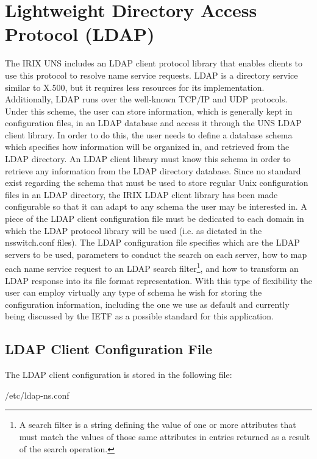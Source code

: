 \section{Lightweight Directory Access Protocol (LDAP)}

The IRIX UNS includes an LDAP client protocol library that
enables clients to use this protocol to resolve name service requests.
LDAP is a directory service similar to X.500, but it requires less resources
for its implementation. Additionally, LDAP runs over the well-known 
TCP/IP and UDP protocols.
Under this scheme, the user can store information, which is generally 
kept in configuration files, in an LDAP database and access it
through the UNS LDAP client library. In order to do this, the user
needs to define a database schema which specifies how information will
be organized in, and retrieved from the LDAP directory. An LDAP client
library must know this schema in order to retrieve any information
from the LDAP directory database. Since no standard
exist regarding the schema that must be used to store regular Unix
configuration files in an LDAP directory, the IRIX LDAP client library
has been made configurable so that it can adapt to any schema the user
may be interested in.
A piece of the LDAP client configuration file must be dedicated to
each domain in which the LDAP protocol library will be used (i.e. as
dictated in the nsswitch.conf files).
The LDAP configuration file specifies which are the LDAP servers to be
used, parameters to conduct the search on each server, how to map each
name service request to an LDAP search filter\footnote{A search filter
is a string defining the value of one or more attributes that must
match the values of those same attributes in entries returned as a
result of the search operation.}, and how to transform an LDAP
response into its file format representation. 
With this type of flexibility the user can employ virtually any type of
schema he wish for storing the configuration information, including
the one we use as default and currently being discussed by the IETF as
a possible standard for this application.

\subsection{LDAP Client Configuration File}

The LDAP client configuration is stored in the following file:

\begin{center}
/etc/ldap-ns.conf
\end{center}

